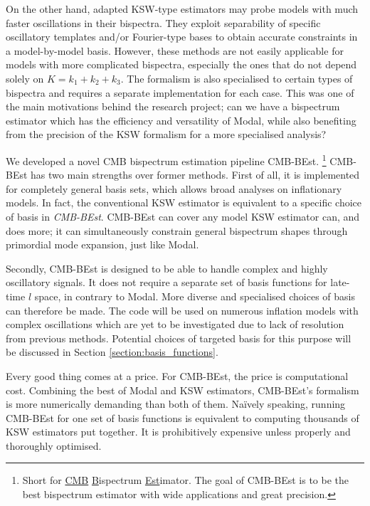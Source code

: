 On the other hand, adapted KSW-type estimators \cite{Munchmeyer2014,Munchmeyer2015resonance,Meerburg2016jointResonance} may probe models with much faster oscillations in their bispectra. They exploit separability of specific oscillatory templates and/or Fourier-type bases to obtain accurate constraints in a model-by-model basis. However, these methods are not easily applicable for models with more complicated bispectra, especially the ones that do not depend solely on $K=k_1+k_2+k_3$. The formalism is also specialised to certain types of bispectra and requires a separate implementation for each case. This was one of the main motivations behind the research project; can we have a bispectrum estimator which has the efficiency and versatility of Modal, while also benefiting from the precision of the KSW formalism for a more specialised analysis?

We developed a novel CMB bispectrum estimation pipeline CMB-BEst. \footnote{Short for \underline{CMB} \underline{B}ispectrum \underline{Est}imator. The goal of CMB-BEst is to be the best bispectrum estimator with wide applications and great precision.} CMB-BEst has two main strengths over former methods. First of all, it is implemented for completely general basis sets, which allows broad analyses on inflationary models. In fact, the conventional KSW estimator is equivalent to a specific choice of basis in \textit{CMB-BEst}. CMB-BEst can cover any model KSW estimator can, and does more; it can simultaneously constrain general bispectrum shapes through primordial mode expansion, just like Modal.

Secondly, CMB-BEst is designed to be able to handle complex and highly oscillatory signals. It does not require a separate set of basis functions for late-time $l$ space, in contrary to Modal. More diverse and specialised choices of basis can therefore be made. The code will be used on numerous inflation models with complex oscillations which are yet to be investigated due to lack of resolution from previous methods. Potential choices of targeted basis for this purpose will be discussed in Section \ref{section:basis_functions}.

Every good thing comes at a price. For CMB-BEst, the price is computational cost. Combining the best of Modal and KSW estimators, CMB-BEst's formalism is more numerically demanding than both of them. Na\"ively speaking, running CMB-BEst for one set of basis functions is equivalent to computing thousands of KSW estimators put together. It is prohibitively expensive unless properly and thoroughly optimised.


